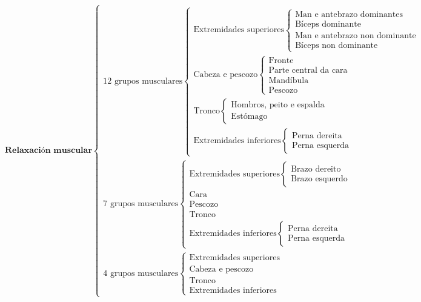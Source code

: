 \documentclass[a4paper,11pt]{article}
\begin{document}
$$\textbf{Relaxación muscular}\left\lbrace\begin{array}{l}
	\text{12 grupos musculares}\left\lbrace\begin{array}{l}
		\text{Extremidades superiores}\left\lbrace\begin{array}{l}
			\text{Man e antebrazo dominantes}\\
			\text{Bíceps dominante}\\
			\text{Man e antebrazo non dominante}\\
			\text{Bíceps non dominante}
		\end{array}\right.\\
		\text{Cabeza e pescozo}\left\lbrace\begin{array}{l}
			\text{Fronte}\\
			\text{Parte central da cara}\\
			\text{Mandíbula}\\
			\text{Pescozo}
		\end{array}\right.\\
		\text{Tronco}\left\lbrace\begin{array}{l}
			\text{Hombros, peito e espalda}\\
			\text{Estómago}
		\end{array}\right.\\
		\text{Extremidades inferiores}\left\lbrace\begin{array}{l}
			\text{Perna dereita}\\
			\text{Perna esquerda}
		\end{array}\right.
	\end{array}\right.\\
	\text{7 grupos musculares}\left\lbrace\begin{array}{l}
		\text{Extremidades superiores}\left\lbrace\begin{array}{l}
			\text{Brazo dereito}\\
			\text{Brazo esquerdo}
		\end{array}\right.\\
		\text{Cara}\\
		\text{Pescozo}\\
		\text{Tronco}\\
		\text{Extremidades inferiores}\left\lbrace\begin{array}{l}
			\text{Perna dereita}\\
			\text{Perna esquerda}
		\end{array}\right.
	\end{array}\right.\\
	\text{4 grupos musculares}\left\lbrace\begin{array}{l}
		\text{Extremidades superiores}\\
		\text{Cabeza e pescozo}\\
		\text{Tronco}\\
		\text{Extremidades inferiores}
	\end{array}\right.
\end{array}\right.$$
\end{document}
